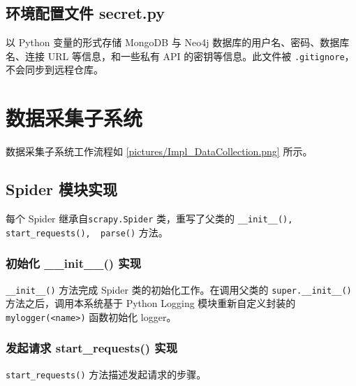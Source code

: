 \documentclass[a4paper,AutoFakeBold,oneside,12pt]{book}
\begin{document}
\subsection{环境配置文件 secret.py}

以 Python 变量的形式存储 MongoDB 与 Neo4j 数据库的用户名、密码、数据库名、连接 URL 等信息，和一些私有 API 的密钥等信息。此文件被 \lstinline|.gitignore|，不会同步到远程仓库。

\section{数据采集子系统}

数据采集子系统工作流程如 \ref{pictures/Impl_DataCollection.png} 所示。


\subsection{Spider 模块实现}

每个 Spider 继承自\lstinline[style = python]|scrapy.Spider| 类，重写了父类的 \lstinline[style = python]|__init__(), start_requests(),  parse()| 方法。

\subsubsection{初始化 {\_\_}init{\_\_}() 实现}

\lstinline[style = python]|__init__()| 方法完成 Spider 类的初始化工作。在调用父类的 \lstinline|super.__init__()| 方法之后，调用本系统基于 Python Logging 模块重新自定义封装的 \lstinline[style = python]|mylogger(<name>)| 函数初始化 logger。

\subsubsection{发起请求 start{\_}requests() 实现}
\lstinline[style = python]|start_requests()| 方法描述发起请求的步骤。
\end{document}
